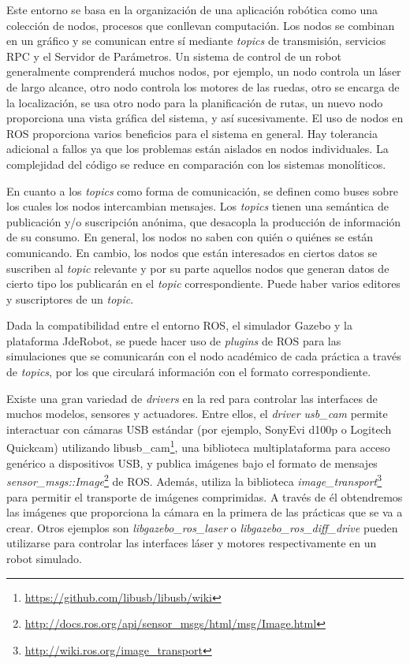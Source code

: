 Este entorno se basa en la organización de una aplicación robótica como una colección de nodos, procesos que conllevan computación. Los nodos se combinan en un gráfico y se comunican entre sí mediante \textit{topics} de transmisión, servicios RPC y el Servidor de Parámetros. Un sistema de control de un robot generalmente comprenderá muchos nodos, por ejemplo, un nodo controla un láser de largo alcance, otro nodo controla los motores de las ruedas, otro se encarga de la localización, se usa otro nodo para la planificación de rutas, un nuevo nodo proporciona una vista gráfica del sistema, y así sucesivamente. El uso de nodos en ROS proporciona varios beneficios para el sistema en general. Hay tolerancia adicional a fallos ya que los problemas están aislados en nodos individuales. La complejidad del código se reduce en comparación con los sistemas monolíticos.

En cuanto a los \textit{topics} como forma de comunicación, se definen como buses sobre los cuales los nodos intercambian mensajes. Los \textit{topics} tienen una semántica de publicación y/o suscripción anónima, que desacopla la producción de información de su consumo. En general, los nodos no saben con quién o quiénes se están comunicando. En cambio, los nodos que están interesados en ciertos datos se suscriben al \textit{topic} relevante y por su parte aquellos nodos que generan datos de cierto tipo los publicarán en el \textit{topic} correspondiente. Puede haber varios editores y suscriptores de un \textit{topic}.

Dada la compatibilidad entre el entorno ROS, el simulador Gazebo y la plataforma JdeRobot, se puede hacer uso de \textit{plugins} de ROS para las simulaciones que se comunicarán con el nodo académico de cada práctica a través de \textit{topics}, por los que circulará información con el formato correspondiente. 

Existe una gran variedad de \textit{drivers} en la red para controlar las interfaces de muchos modelos, sensores y actuadores. Entre ellos, el \textit{driver usb\_cam} permite interactuar con cámaras USB estándar (por ejemplo, SonyEvi d100p o Logitech Quickcam) utilizando libusb\_cam\footnote{\url{https://github.com/libusb/libusb/wiki}}, una biblioteca multiplataforma para acceso genérico a dispositivos USB, y publica imágenes bajo el formato de mensajes \textit{sensor\_msgs::Image}\footnote{\url{http://docs.ros.org/api/sensor\_msgs/html/msg/Image.html}} 
 de ROS. Además, utiliza la biblioteca \textit{image\_transport}\footnote{\url{http://wiki.ros.org/image\_transport}} para permitir el transporte de imágenes comprimidas. A través de él obtendremos las imágenes que proporciona la cámara en la primera de las prácticas que se va a crear. Otros ejemplos son \textit{libgazebo\_ros\_laser} o \textit{libgazebo\_ros\_diff\_drive} pueden utilizarse para controlar las interfaces láser y motores respectivamente en un robot simulado.

